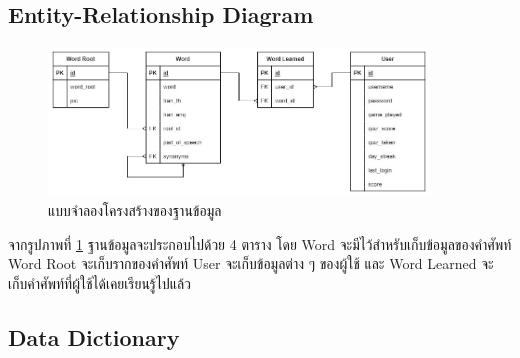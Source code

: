 \documentclass[12pt,oneside,openright,a4paper]{cpe-thai-project}
\begin{document}
\subsection{Entity-Relationship Diagram} \label{ssec:DB}
\begin{figure}[!h]\centering
	\includegraphics[width=0.9\textwidth, keepaspectratio=true]{image/chap3/ER diagrams.jpg}
	\caption{แบบจำลองโครงสร้างของฐานข้อมูล}\label{fig:ERDiagram}
\end{figure}
\hspace{1cm}
จากรูปภาพที่ \ref{fig:ERDiagram} ฐานข้อมูลจะประกอบไปด้วย 4 ตาราง โดย Word จะมีไว้สำหรับเก็บข้อมูลของคำศัพท์ Word Root
จะเก็บรากของคำศัพท์ User จะเก็บข้อมูลต่าง ๆ ของผู้ใช้ และ Word Learned จะเก็บคำศัพท์ที่ผู้ใช้ได้เคยเรียนรู้ไปแล้ว

\pagebreak
\subsection{Data Dictionary}
\end{document}
